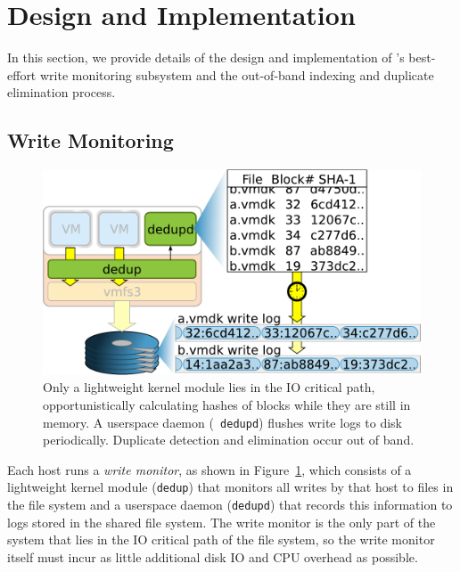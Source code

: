 


\section{Design and Implementation}
\label{sec:design}

In this section, we provide details of the design and implementation
of \DeDe's best-effort write
monitoring subsystem and the out-of-band indexing and duplicate
elimination process.

\subsection{Write Monitoring}
\label{sec:idea:stale-wlog}


\begin{figure}[t]
\centerline {
\includegraphics[scale=0.45]{figures/writemon.pdf}
}
\caption{Only a lightweight kernel module lies
  in the IO critical path, opportunistically calculating hashes of
  blocks while they are still in memory. A userspace daemon ({\tt
    \small dedupd}) flushes write logs to disk periodically. Duplicate
  detection and elimination occur out of band.}
\label{fig:write-monitoring}
\end{figure}


Each host runs a \emph{write monitor}, as shown in
Figure~\ref{fig:write-monitoring}, which consists of a lightweight
kernel module ({\tt \small dedup}) that monitors all writes by that host
to files in the file system and a userspace daemon ({\tt \small dedupd}) that
records this information to logs stored in the shared file system.
The write monitor is the only part of the system that lies in the
IO critical path of the file system, so the write monitor itself must
incur as little additional disk IO and CPU overhead as possible.

